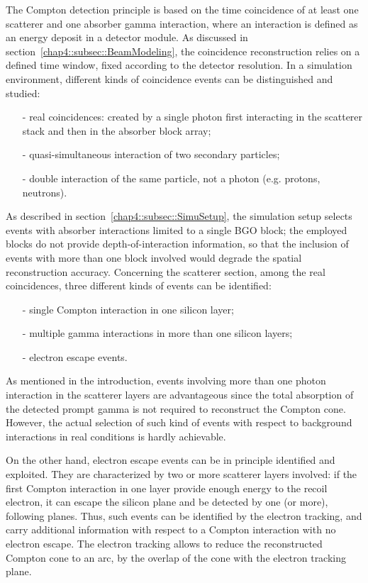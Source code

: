 The Compton detection principle is based on the time coincidence of at least one scatterer and one absorber gamma interaction, where an interaction is defined as an energy deposit in a detector module. As discussed in section~\ref{chap4::subsec::BeamModeling}, the coincidence reconstruction relies on a defined time window, fixed according to the detector resolution. In a simulation environment, different kinds of coincidence events can be distinguished and studied: 
\begin{itemize}
\item[-] real coincidences: created by a single photon first interacting in the scatterer stack and then in the absorber block array;
\item[-] quasi-simultaneous interaction of two secondary particles;
\item[-] double interaction of the same particle, not a photon (e.g. protons, neutrons).
\end{itemize}
As described in section~\ref{chap4::subsec::SimuSetup}, the simulation setup selects events with absorber interactions limited to a single BGO block; the employed blocks do not provide depth-of-interaction information, so that the inclusion of events with more than one block involved would degrade the spatial reconstruction accuracy.
Concerning the scatterer section, among the real coincidences, three different kinds of events can be identified:
\begin{itemize}
\item[-] single Compton interaction in one silicon layer;
\item[-] multiple gamma interactions in more than one silicon layers;
\item[-] electron escape events.
\end{itemize}
As mentioned in the introduction, events involving more than one photon interaction in the scatterer layers are advantageous since the total absorption of the detected prompt gamma is not required to reconstruct the Compton cone. However, the actual selection of such kind of events with respect to background interactions in real conditions is hardly achievable.

On the other hand, electron escape events can be in principle identified and exploited. They are characterized by two or more scatterer layers involved: if the first Compton interaction in one layer provide enough energy to the recoil electron, it can escape the silicon plane and be detected by one (or more), following planes. Thus, such events can be identified by the electron tracking, and carry additional information with respect to a Compton interaction with no electron escape. The electron tracking allows to reduce the reconstructed Compton cone to an arc, by the overlap of the cone with the electron tracking plane.      

